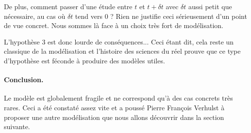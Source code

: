 \smallskip

De plus, comment passer d'une étude entre $t$ et $t + \delta t$ avec $\delta t$ aussi petit que nécessaire, au cas où $\delta t$ tend vers $0$ ? Rien ne justifie ceci sérieusement d'un point de vue concret. Nous sommes là face à un choix très fort de modélisation.

\smallskip

L'hypothèse 3 est donc lourde de conséquences... Ceci étant dit, cela reste un classique de la modélisation et l'histoire des sciences du réel prouve que ce type d'hypothèse est féconde à produire des modèles utiles.




\paragraph{Conclusion.}
Le modèle est globalement fragile et ne correspond qu'à des cas concrets très rares. Ceci a été constaté assez vite et a poussé Pierre François Verhulst à proposer une autre modélisation que nous allons découvrir dans la section suivante.
